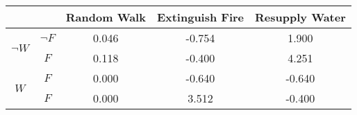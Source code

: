 \begin{center}
\begin{tabular}{|c|c|c|c|c|}
  \hline
  &   & Random Walk & Extinguish Fire & Resupply Water\\
  \hline
  \multirow{2}{*}{$\neg W$} & $\neg F$ & 0.046 & -0.754 & 1.900\\
  \cline{2-5}
   & $F$ & 0.118 & -0.400 & 4.251\\
  \hline
  \multirow{2}{*}{$W$} & $F$ & 0.000 & -0.640 & -0.640\\
  \cline{2-5}
   & $F$ & 0.000 & 3.512 & -0.400\\
  \hline
\end{tabular}
\end{center}
